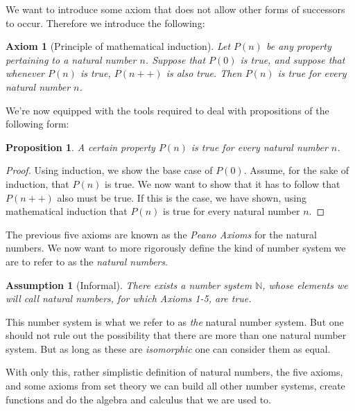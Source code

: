 \documentclass[a4paper, twocolumn]{report}
\newcounter{dummy} \numberwithin{dummy}{section}
\newcounter{axmcntr} \numberwithin{axmcntr}{chapter}
\newtheorem{axm}[axmcntr]{Axiom}
\newtheorem{prp}[dummy]{Proposition}
\newtheorem{asm}[axmcntr]{Assumption}
\theoremstyle{definition}
\theoremstyle{solution}
\newcommand{\dplus}{{+}{+}} %
\begin{document}
We want to introduce some axiom that does not allow other forms of successors to occur.
Therefore we introduce the following:

\begin{axm}[Principle of mathematical induction]
  \label{axm_25}
  Let $P\left( n \right)$ be any property pertaining to a natural number $n$.
  Suppose that $P\left( 0 \right)$ is true, and suppose that whenever $P\left(
  n \right)$ is true, $P(n\dplus)$ is also true. Then $P(n)$ is true for every
  natural number $n$. 
\end{axm}

\addtocounter{dummy}{1}
We're now equipped with the tools required to deal with propositions of the following form:
\begin{prp}
  \label{prp_2111}
  A certain property $P(n)$ is true for every natural number $n$.  
\end{prp}
\begin{proof}
  Using induction, we show the base case of $P(0)$. Assume, for the sake of
  induction, that $P(n)$ is true. We now want to show that it has to follow
  that $P(n\dplus)$ also must be true. If this is the case, we have shown, using
  mathematical induction that $P(n)$ is true for every natural number $n$.
\end{proof}

The previous five axioms are known as the \textit{Peano Axioms} for the natural
numbers.  We now want to more rigorously define the kind of number system we
are to refer to as the \textit{natural numbers}.

\begin{asm}[Informal]
  \label{asm_26}
  There exists a number system $\mathbb{N}$, whose elements we will call
  \textrm{natural numbers}, for which Axioms 1-5, are true.
\end{asm}

\addtocounter{dummy}{1}
\addtocounter{dummy}{1}
\addtocounter{dummy}{1}
\addtocounter{dummy}{1}

This number system is what we refer to as \textit{the} natural number system.
But one should not rule out the possibility that there are more than one
natural number system. But as long as these are \textit{isomorphic} one can
consider them as equal.

With only this, rather simplistic definition of natural numbers, the five
axioms, and some axioms from set theory we can build all other number systems,
create functions and do the algebra and calculus that we are used to.
\end{document}
